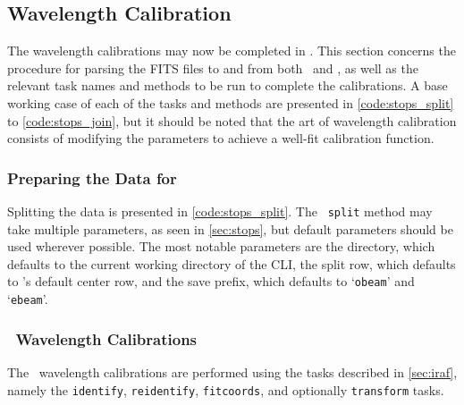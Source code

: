 \pagebreak

\subsection{Wavelength Calibration} \label{subsec:reduc_wav}

The wavelength calibrations may now be completed in \iraf. This section concerns the procedure for parsing the \gls{FITS} files to and from both \iraf\ and \polsalt, as well as the relevant task names and methods to be run to complete the calibrations. A base working case of each of the tasks and methods are presented in \autoref{code:stops_split} to \ref{code:stops_join}, but it should be noted that the art of wavelength calibration consists of modifying the parameters to achieve a well-fit calibration function.%

\subsubsection{Preparing the Data for \iraf}

Splitting the data is presented in \autoref{code:stops_split}. The \stops\ \texttt{split} method may take multiple parameters, as seen in \autoref{sec:stops}, but default parameters should be used wherever possible. The most notable parameters are the directory, which defaults to the current working directory of the \gls{CLI}, the split row, which defaults to \polsalt's default center row, and the save prefix, which defaults to `\texttt{obeam}' and `\texttt{ebeam}'.

\subsubsection{\iraf\ Wavelength Calibrations}

The \iraf\ wavelength calibrations are performed using the tasks described in \autoref{sec:iraf}, namely the \texttt{identify}, \texttt{reidentify}, \texttt{fitcoords}, and optionally \texttt{transform} tasks.

